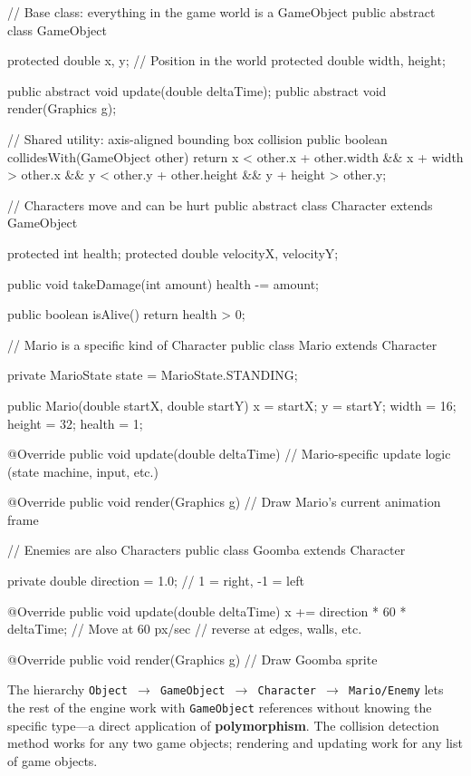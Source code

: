 \documentclass[11pt,letterpaper]{article}
\newcommand{\keyterm}[1]{\textbf{\textcolor{cssecondary}{#1}}}
\begin{document}
\begin{javacode}
// Base class: everything in the game world is a GameObject
public abstract class GameObject {
    protected double x, y;       // Position in the world
    protected double width, height;

    public abstract void update(double deltaTime);
    public abstract void render(Graphics g);

    // Shared utility: axis-aligned bounding box collision
    public boolean collidesWith(GameObject other) {
        return x < other.x + other.width
            && x + width > other.x
            && y < other.y + other.height
            && y + height > other.y;
    }
}

// Characters move and can be hurt
public abstract class Character extends GameObject {
    protected int health;
    protected double velocityX, velocityY;

    public void takeDamage(int amount) {
        health -= amount;
    }

    public boolean isAlive() {
        return health > 0;
    }
}

// Mario is a specific kind of Character
public class Mario extends Character {
    private MarioState state = MarioState.STANDING;

    public Mario(double startX, double startY) {
        x = startX; y = startY;
        width = 16; height = 32;
        health = 1;
    }

    @Override
    public void update(double deltaTime) {
        // Mario-specific update logic (state machine, input, etc.)
    }

    @Override
    public void render(Graphics g) {
        // Draw Mario's current animation frame
    }
}

// Enemies are also Characters
public class Goomba extends Character {
    private double direction = 1.0;   // 1 = right, -1 = left

    @Override
    public void update(double deltaTime) {
        x += direction * 60 * deltaTime;   // Move at 60 px/sec
        // reverse at edges, walls, etc.
    }

    @Override
    public void render(Graphics g) {
        // Draw Goomba sprite
    }
}
\end{javacode}

The hierarchy \texttt{Object $\to$ GameObject $\to$ Character $\to$ Mario/Enemy} lets the rest of the engine work with \texttt{GameObject} references without knowing the specific type---a direct application of \keyterm{polymorphism}. The collision detection method works for any two game objects; rendering and updating work for any list of game objects.
\end{document}
